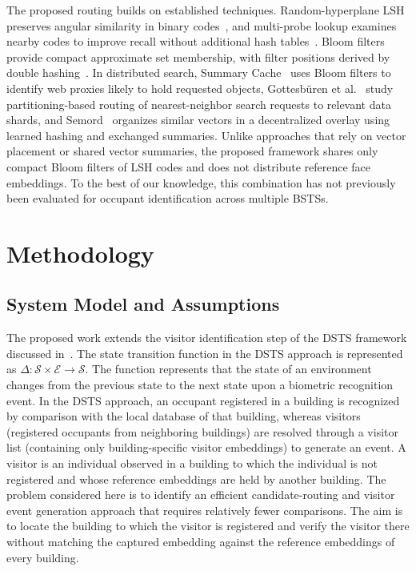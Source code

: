 \documentclass[pdflatex,sn-mathphys-num]{sn-jnl}%
\theoremstyle{thmstyleone}%
\theoremstyle{thmstyletwo}%
\theoremstyle{thmstylethree}%
\begin{document}
The proposed routing builds on established techniques. Random-hyperplane LSH preserves angular similarity in binary codes~\cite{charikar2002}, and multi-probe lookup examines nearby codes to improve recall without additional hash tables~\cite{lv2007}. Bloom filters~\cite{bloom1970} provide compact approximate set membership, with filter positions derived by double hashing~\cite{kirsch2006}. In distributed search, Summary Cache~\cite{fan2000} uses Bloom filters to identify web proxies likely to hold requested objects, Gottesb{\"u}ren et al.~\cite{gottesbueren2024} study partitioning-based routing of nearest-neighbor search requests to relevant data shards, and Semord~\cite{wang2026semord} organizes similar vectors in a decentralized overlay using learned hashing and exchanged summaries. Unlike approaches that rely on vector placement or shared vector summaries, the proposed framework shares only compact Bloom filters of LSH codes and does not distribute reference face embeddings. To the best of our knowledge, this combination has not previously been evaluated for occupant identification across multiple BSTSs.


\section{Methodology}
\label{sec:methodology}

\subsection{System Model and Assumptions}
\label{subsec:system_model}

The proposed work extends the visitor identification step of the DSTS framework discussed in~\cite{mohan2020}. The state transition function in the DSTS approach is represented as $\Delta:\mathcal{S} \times \mathcal{E} \rightarrow \mathcal{S}$. The function represents that the state of an environment changes from the previous state to the next state upon a biometric recognition event. In the DSTS approach, an occupant registered in a building is recognized by comparison with the local database of that building, whereas visitors (registered occupants from neighboring buildings) are resolved through a visitor list (containing only building-specific visitor embeddings) to generate an event. A visitor is an individual observed in a building to which the individual is not registered and whose reference embeddings are held by another building. The problem considered here is to identify an efficient candidate-routing and visitor event generation approach that requires relatively fewer comparisons. The aim is to locate the building to which the visitor is registered and verify the visitor there without matching the captured embedding against the reference embeddings of every building.
\end{document}
